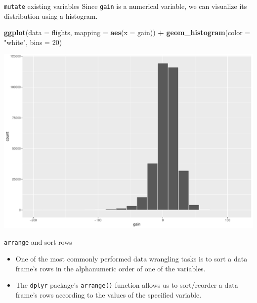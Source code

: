 \documentclass[
  ignorenonframetext,
]{beamer}
\newenvironment{Shaded}{\begin{snugshade}}{\end{snugshade}}
\newcommand{\AttributeTok}[1]{\textcolor[rgb]{0.13,0.29,0.53}{#1}}
\newcommand{\DecValTok}[1]{\textcolor[rgb]{0.00,0.00,0.81}{#1}}
\newcommand{\FunctionTok}[1]{\textcolor[rgb]{0.13,0.29,0.53}{\textbf{#1}}}
\newcommand{\NormalTok}[1]{#1}
\newcommand{\SpecialCharTok}[1]{\textcolor[rgb]{0.81,0.36,0.00}{\textbf{#1}}}
\newcommand{\StringTok}[1]{\textcolor[rgb]{0.31,0.60,0.02}{#1}}
\begin{document}
\begin{frame}[fragile]{\texttt{mutate} existing variables}
\protect\hypertarget{mutate-existing-variables-5}{}
Since \texttt{gain} is a numerical variable, we can visualize its
distribution using a histogram.

\tiny

\begin{Shaded}
\begin{Highlighting}[]
\FunctionTok{ggplot}\NormalTok{(}\AttributeTok{data =}\NormalTok{ flights, }\AttributeTok{mapping =} \FunctionTok{aes}\NormalTok{(}\AttributeTok{x =}\NormalTok{ gain)) }\SpecialCharTok{+}
  \FunctionTok{geom\_histogram}\NormalTok{(}\AttributeTok{color =} \StringTok{"white"}\NormalTok{, }\AttributeTok{bins =} \DecValTok{20}\NormalTok{)}
\end{Highlighting}
\end{Shaded}

\begin{center}\includegraphics[width=0.7\linewidth,height=0.5\textheight]{Week3_Lect_files/figure-beamer/unnamed-chunk-26-1} \end{center}
\normalsize
\end{frame}

\begin{frame}[fragile]{\texttt{arrange} and sort rows}
\protect\hypertarget{arrange-and-sort-rows}{}
\begin{itemize}
\item
  One of the most commonly performed data wrangling tasks is to sort a
  data frame's rows in the alphanumeric order of one of the variables.
\item
  The \texttt{dplyr} package's \texttt{arrange()} function allows us to
  sort/reorder a data frame's rows according to the values of the
  specified variable.
\end{itemize}
\end{frame}
\end{document}

